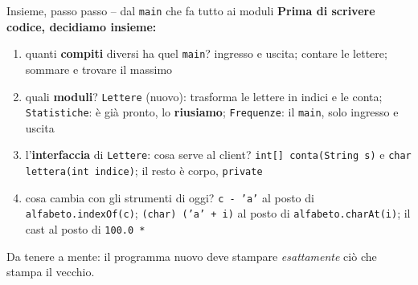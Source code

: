 \documentclass[10pt,aspectratio=169]{beamer}
\begin{document}
\begin{frame}[fragile]{Insieme, passo passo -- dal \texttt{main} che fa tutto ai moduli}
\small
\textbf{Prima di scrivere codice, decidiamo insieme:}
\begin{enumerate}\itemsep=3pt
    \item quanti \textbf{compiti} diversi ha quel \texttt{main}? \textrightarrow{} ingresso e uscita; contare le lettere; sommare e trovare il massimo
    \item quali \textbf{moduli}? \textrightarrow{} \texttt{Lettere} (nuovo): trasforma le lettere in indici e le conta; \texttt{Statistiche}: è già pronto, lo \textbf{riusiamo}; \texttt{Frequenze}: il \texttt{main}, solo ingresso e uscita
    \item l'\textbf{interfaccia} di \texttt{Lettere}: cosa serve al client? \textrightarrow{} \texttt{int[] conta(String s)} e \texttt{char lettera(int indice)}; il resto è corpo, \texttt{private}
    \item cosa cambia con gli strumenti di oggi? \textrightarrow{} \texttt{c - 'a'} al posto di \texttt{alfabeto.indexOf(c)}; \texttt{(char) ('a' + i)} al posto di \texttt{alfabeto.charAt(i)}; il cast al posto di \texttt{100.0 *}
\end{enumerate}


Da tenere a mente: il programma nuovo deve stampare \emph{esattamente} ciò che stampa il vecchio.
\end{frame}
\end{document}
